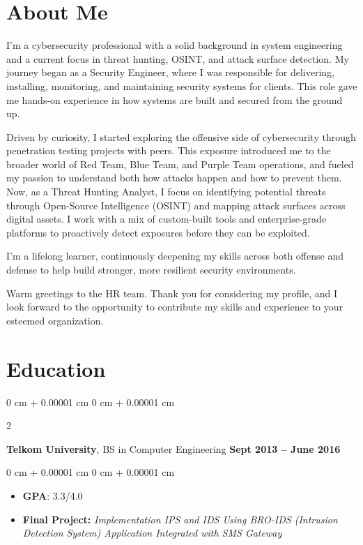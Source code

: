 \documentclass[10pt, letterpaper]{article}
\newenvironment{highlights}{
    \begin{itemize}[
        topsep=0.10 cm,
        parsep=0.10 cm,
        partopsep=0pt,
        itemsep=0pt,
        leftmargin=0 cm + 10pt
    ]
}{
    \end{itemize}
} %
\newenvironment{onecolentry}{
    \begin{adjustwidth}{
        0 cm + 0.00001 cm
    }{
        0 cm + 0.00001 cm
    }
}{
    \end{adjustwidth}
} %
\newenvironment{twocolentry}[2][]{
    \onecolentry
    \def\secondColumn{#2}
    \setcolumnwidth{\fill, 4.5 cm}
    \begin{paracol}{2}
}{
    \switchcolumn \raggedleft \secondColumn
    \end{paracol}
    \endonecolentry
} %
\begin{document}
    \section{About Me}   
     \vspace{0.35 cm}     
       \begin{justify}
       	I’m a cybersecurity professional with a solid background in system engineering and a current focus in threat hunting, OSINT, and attack surface detection. My journey began as a Security Engineer, where I was responsible for delivering, installing, monitoring, and maintaining security systems for clients. This role gave me hands-on experience in how systems are built and secured from the ground up.
	
       	Driven by curiosity, I started exploring the offensive side of cybersecurity through penetration testing projects with peers. This exposure introduced me to the broader world of Red Team, Blue Team, and Purple Team operations, and fueled my passion to understand both how attacks happen and how to prevent them. Now, as a Threat Hunting Analyst, I focus on identifying potential threats through Open-Source Intelligence (OSINT) and mapping attack surfaces across digital assets. I work with a mix of custom-built tools and enterprise-grade platforms to proactively detect exposures before they can be exploited.

I’m a lifelong learner, continuously deepening my skills across both offense and defense to help build stronger, more resilient security environments.
       	
       	\vspace{0.2cm}
       	\noindent Warm greetings to the HR team. Thank you for considering my profile, and I look forward to the opportunity to contribute my skills and experience to your esteemed organization.
       \end{justify}
       

    \section{Education}
   \vspace{0.35 cm}
        \begin{twocolentry}{
            \textbf{Sept 2013 – June 2016}
        }
            \textbf{Telkom University}, BS in Computer Engineering\end{twocolentry}

        \vspace{0.10 cm}
        \begin{onecolentry}
            \begin{highlights}
                \item \textbf{GPA}: 3.3/4.0
                \item \textbf{Final Project:} \textit{Implementation IPS and IDS Using BRO-IDS (Intrusion Detection System) Application Integrated with SMS Gateway}
            \end{highlights}
        \end{onecolentry}
\end{document}
